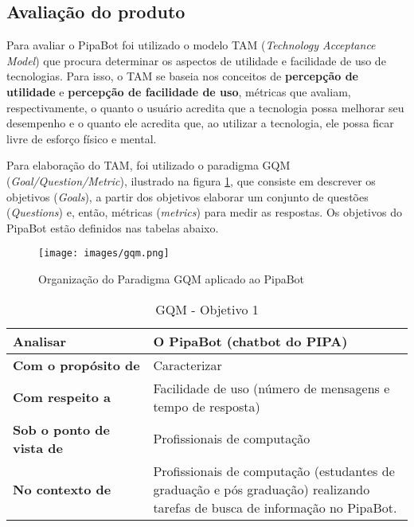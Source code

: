   \subsection{Avaliação do produto}
  Para avaliar o PipaBot foi utilizado o modelo TAM (\textit{Technology Acceptance Model})\cite{tam_davis} que procura determinar os aspectos de utilidade e facilidade de uso de tecnologias. Para isso, o TAM se baseia nos conceitos de \textbf{percepção de utilidade} e \textbf{percepção de facilidade de uso}, métricas que avaliam, respectivamente, o quanto o usuário acredita que a tecnologia possa melhorar seu desempenho e o quanto ele acredita que, ao utilizar a tecnologia, ele possa ficar livre de esforço físico e mental.
  
  Para elaboração do TAM, foi utilizado o paradigma GQM (\textit{Goal/Question/Metric}), ilustrado na figura \ref{fig:gqm}, que consiste em descrever os objetivos (\textit{Goals}), a partir dos objetivos elaborar um conjunto de questões (\textit{Questions}) e, então, métricas (\textit{metrics}) para medir as respostas. Os objetivos do PipaBot estão definidos nas tabelas abaixo.
  
  \begin{figure}[h!]
  	\begin{center}
  		\texttt{[image: images/gqm.png]}
  		\caption{Organização do Paradigma GQM aplicado ao PipaBot}
  		\label{fig:gqm}
  	\end{center}
  \end{figure}
  
  \begin{center}
  	\begin{table}[h!]
  		\begin{tabular}{ | m{0.35\linewidth} | m{0.65\linewidth} | } 
  			\hline
  			\textbf{Analisar} & O PipaBot (chatbot do PIPA) \\ 
  			\hline
  			\textbf{Com o propósito de} & Caracterizar \\ 
  			\hline
  			\textbf{Com respeito a} & Facilidade de uso (número de mensagens e tempo de resposta) \\ 
  			\hline
  			\textbf{Sob o ponto de vista de} & Profissionais de computação \\
  			\hline
  			\textbf{No contexto de} & Profissionais de computação (estudantes de graduação e pós graduação) realizando tarefas de busca de informação no PipaBot. \\
  			\hline
  		\end{tabular}
  	  \caption{GQM - Objetivo 1}
  	  \label{tab:obj1}  	  
  	\end{table}
  \end{center}

